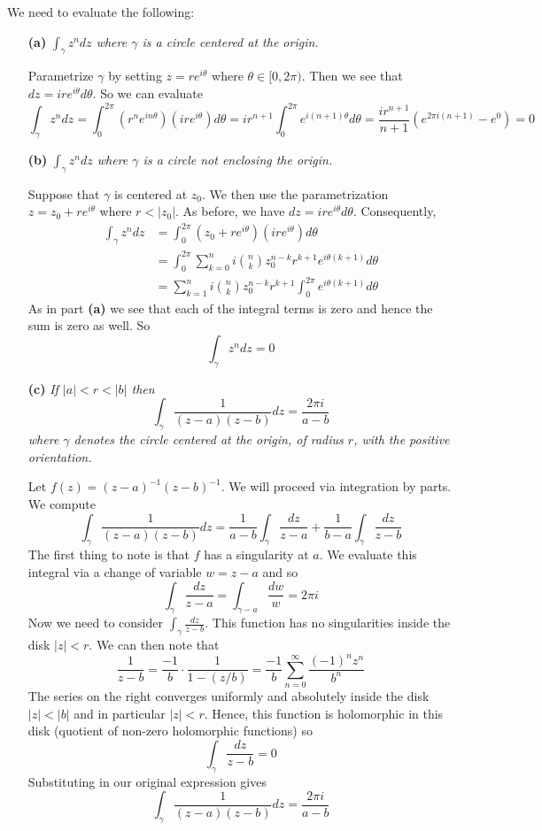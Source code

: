 \documentclass{article}
\newcommand{\exercise}[1]{\noindent{\textbf{Exercise #1:}}}
\begin{document}
\exercise{1.4.25}
We need to evaluate the following:
\begin{enumerate}
\item[\textbf{(a)}] \textit{$\int_\gamma z^ndz$ where $\gamma$ is a circle
  centered at the origin.}

Parametrize $\gamma$ by setting $z = re^{i\theta}$ where $\theta \in
[0,2\pi)$. Then we see that $dz = ire^{i\theta}d\theta$. So we can evaluate
\[
\int_\gamma z^ndz =
\int_0^{2\pi}(r^ne^{in\theta})(ire^{i\theta})d\theta =
ir^{n+1}\int_0^{2\pi}e^{i(n+1)\theta}d\theta =
\frac{ir^{n+1}}{n+1}(e^{2\pi i(n+1)} - e^0) = 0
\]

\item[\textbf{(b)}] \textit{$\int_\gamma z^ndz$ where $\gamma$ is a circle
  not enclosing the origin.}

Suppose that $\gamma$ is centered at $z_0$. We then use the
parametrization $z = z_0 + re^{i\theta}$ where $r < |z_0|$. As before,
we have $dz = ire^{i\theta}d\theta$. Consequently,
\begin{align*}
  \int_\gamma z^ndz &= \int_0^{2\pi}(z_0 + re^{i\theta})(ire^{i\theta})d\theta\\
  &= \int_0^{2\pi} \sum_{k=0}^n
  i\binom{n}{k}z_0^{n-k}r^{k+1}e^{i\theta(k+1)}d\theta \\
  &= \sum_{k=1}^ni\binom{n}{k}z_0^{n-k}r^{k+1}\int_0^{2\pi}
  e^{i\theta(k+1)}d\theta
\end{align*}
As in part \textbf{(a)} we see that each of the integral terms is zero
and hence the sum is zero as well. So
\[
\int_\gamma z^ndz = 0
\]

\item[\textbf{(c)}] \textit{If $|a| < r < |b|$ then}
\[
\int_\gamma \frac{1}{(z-a)(z-b)}dz = \frac{2\pi i}{a - b}
\]
\textit{where $\gamma$ denotes the circle centered at the origin, of
  radius $r$, with the positive orientation.}

Let $f(z) = (z-a)^{-1}(z-b)^{-1}$. We will proceed via integration by
parts. We compute
\[
\int_\gamma \frac{1}{(z-a)(z-b)}dz = \frac{1}{a-b}\int_\gamma
\frac{dz}{z-a} + \frac{1}{b-a}\int_\gamma \frac{dz}{z - b}
\]
The first thing to note is that $f$ has a singularity at $a$. We
evaluate this integral via a change of variable $w = z - a$ and so
\[
\int_\gamma\frac{dz}{z-a} = \int_{\gamma - a} \frac{dw}{w} = 2\pi i
\]
Now we need to consider $\int_\gamma \frac{dz}{z-b}$. This function
has no singularities inside the disk $|z| < r$. We can then note that
\[
\frac{1}{z-b} = \frac{-1}{b}\cdot\frac{1}{1-(z/b)} =
\frac{-1}{b}\sum_{n=0}^\infty \frac{(-1)^nz^n}{b^n}
\]
The series on the right converges uniformly and absolutely inside the
disk $|z| < |b|$ and in particular $|z| < r$. Hence, this function is
holomorphic in this disk (quotient of non-zero holomorphic functions) so
\[
\int_\gamma \frac{dz}{z-b} = 0
\]
Substituting in our original expression gives
\[
\int_\gamma \frac{1}{(z-a)(z-b)}dz = \frac{2\pi i}{a - b}
\]
\end{enumerate}
\end{document}
